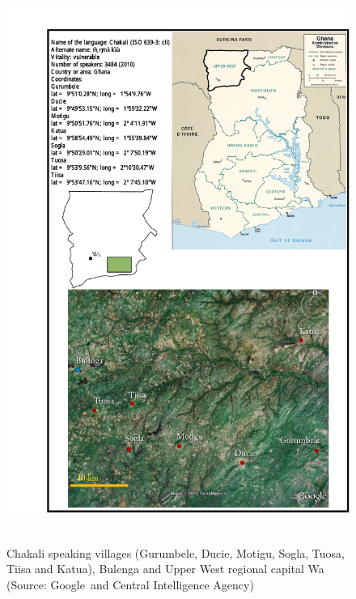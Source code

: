 \begin{figure}[htp]
\centering
\includegraphics[clip=true, trim= 20mm 0mm 0mm 10mm, 
height=7.2in]{Graphic/Maps/climap.pdf}

\caption[Chakali speaking area]{Chakali
speaking villages (Gurumbele,
Ducie, Motigu, Sogla, Tuosa, Tiisa and  Katua), Bulenga and Upper West
 regional capital Wa (Source: Google\texttrademark \   and Central Intelligence
Agency) \label{fig:INT-cliland}}
\end{figure}












